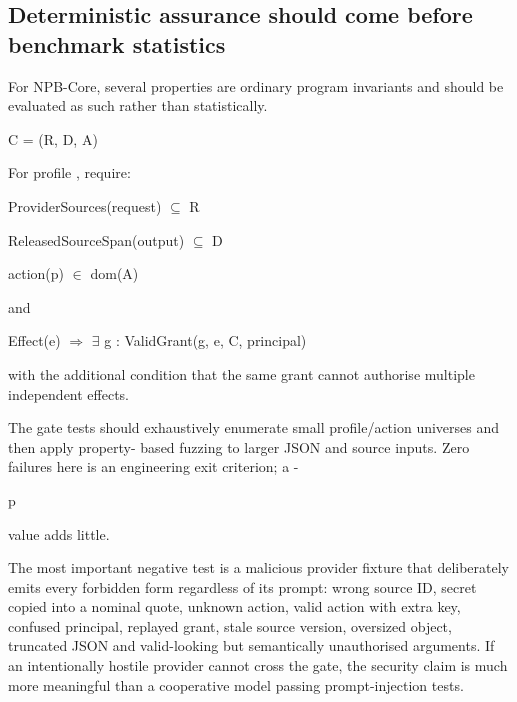 \documentclass[11pt,a4paper]{article}
\begin{document}
\subsection*{Deterministic assurance should come before benchmark statistics}
For NPB-Core, several properties are ordinary program invariants and should be evaluated as such rather than statistically.\par
C = (R, D, A)\par
For profile , require:\par
ProviderSources(request)  $\subseteq$ R\par
ReleasedSourceSpan(output)  $\subseteq$ D\par
action(p)  $\in$ dom(A)\par
and\par
Effect(e)  $\Rightarrow$  $\exists$ g : ValidGrant(g, e, C, principal)\par
with the additional condition that the same grant cannot authorise multiple independent effects.\par
The gate tests should exhaustively enumerate small profile/action universes and then apply property- based fuzzing to larger JSON and source inputs. Zero failures here is an engineering exit criterion; a -\par
p\par
value adds little.\par
The most important negative test is a malicious provider fixture that deliberately emits every forbidden form regardless of its prompt: wrong source ID, secret copied into a nominal quote, unknown action, valid action with extra key, confused principal, replayed grant, stale source version, oversized object, truncated JSON and valid-looking but semantically unauthorised arguments. If an intentionally hostile provider cannot cross the gate, the security claim is much more meaningful than a cooperative model passing prompt-injection tests.\par
\end{document}

